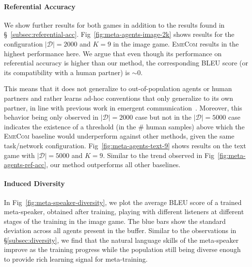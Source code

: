 \documentclass{article}
\begin{document}
\paragraph{Referential Accuracy} We show further results for both games in addition to the results found in \S~\ref{subsec:referential-acc}. Fig~\ref{fig:meta-agents-image-2k} shows results for the configuration $|\mathcal{D}|=2000$ and $K=9$ in the image game. \textsc{EmeCom} results in the highest performance here. We argue that even though its performance on referential accuracy is higher than our method, the corresponding BLEU score (or its compatibility with a human partner) is $\sim 0$.

This means that it does not generalize to out-of-population agents or human partners and rather learns ad-hoc conventions that only generalize to its own partner, in line with previous work in emergent communication~\citep{lazaridou-etal-2020-multi}. Moreover, this behavior being only observed in $|\mathcal{D}|=2000$ case but not in the $|\mathcal{D}|=5000$ case indicates the existence of a threshold (in the \# human samples) above which the \textsc{EmeCom} baseline would underperform against other methods, given the same task/network configuration. Fig~\ref{fig:meta-agents-text-9} shows results on the text game with $|\mathcal{D}|=5000$ and $K=9$. Similar to the trend observed in Fig~\ref{fig:meta-agents-ref-acc}, our method outperforms all other baselines.

\paragraph{Induced Diversity} In Fig~\ref{fig:meta-speaker-diversity}, we plot the average BLEU score of a trained meta-speaker, obtained after training, playing with different listeners at different stages of the training in the image game. The blue bars show the standard deviation across all agents present in the buffer. Similar to the observations in \S\ref{subsec:diversity}, we find that the natural language skills of the meta-speaker improve as the training progress while the population still being diverse enough to provide rich learning signal for meta-training.
\end{document}
